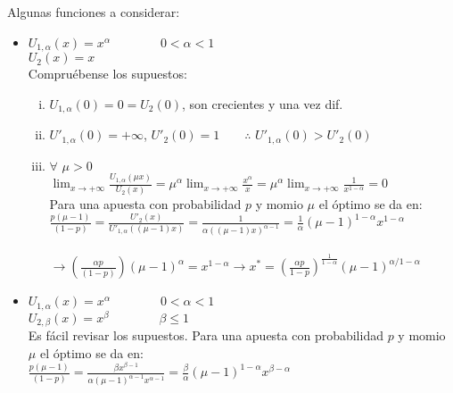  Algunas funciones a considerar:
 \begin{itemize}
  \item $U_{1,\alpha}(x)=x^{\alpha}\qquad\qquad 0<\alpha<1$\\ 
  $U_2(x)=x$\\
 
  Compruébense los supuestos:
  \begin{enumerate}[(i)]
   \item $U_{1,\alpha}(0)=0=U_2(0)$, son crecientes y una vez dif.
   \item $U'_{1,\alpha}(0)=+\infty$, $U'_2(0)=1\qquad{\therefore \,\, U'_{1,\alpha}(0)>U'_2(0)}$
   \item $\forall \,\, \mu>0$\\
  
   $\displaystyle\lim_{x\rightarrow +\infty}\displaystyle\frac{U_{1,\alpha}(\mu x)}{U_2(x)}=\mu^{\alpha}\displaystyle\lim_{x\rightarrow +\infty}\displaystyle\frac{x^{\alpha}}{x}=\mu^{\alpha}\displaystyle\lim_{x\rightarrow +\infty}\displaystyle\frac{1}{x^{1-\alpha}}=0$\\
  
   Para una apuesta con probabilidad $p$ y momio $\mu$ el óptimo se da en:\\
  
   $\displaystyle{\frac{p(\mu-1)}{(1-p)}=\frac{U'_2(x)}{U'_{1,\alpha}((\mu-1)x)}=\frac{1}{\alpha((\mu-1)x)^{\alpha-1}}=\frac{1}{\alpha}(\mu-1)^{1-\alpha}x^{1-\alpha}}$\\\\
  
   $\rightarrow \left(\displaystyle\frac{\alpha p}{(1-p)}\right)(\mu-1)^{\alpha}=x^{1-\alpha}\rightarrow x^*=\left(\displaystyle\frac{\alpha p}{1-p}\right)^{\frac{1}{1-\alpha}}(\mu-1)^{\alpha/1-\alpha}$\\
  \end{enumerate}

  \item $U_{1,\alpha}(x)=x^{\alpha}\qquad\qquad 0<\alpha<1$\\
  $U_{2,\beta}(x)=x^{\beta}\qquad\qquad \beta \le1$\\
 
  Es fácil revisar los supuestos. Para una apuesta con probabilidad $p$ y momio $\mu$ el óptimo se da en:\\
 
  ${\displaystyle\frac{p(\mu-1)}{(1-p)}=\frac{\beta x^{\beta-1}}{\alpha(\mu-1)^{\alpha-1}x^{\alpha-1}}=\frac{\beta}{\alpha}(\mu-1)^{1-\alpha}x^{\beta-\alpha}}$\\
 

\end{itemize}
